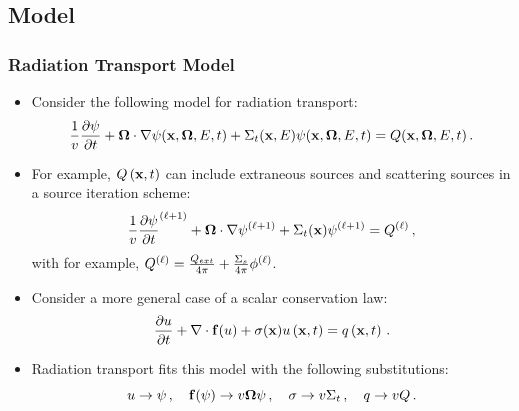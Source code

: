\documentclass{beamer} \useoutertheme{infolines}
\begin{document}
\subsection{Model}
\begin{frame}
\frametitle{Radiation Transport Model}

\begin{itemize}
  \item Consider the following model for radiation transport:
    \begin{equation}\label{eq:rad_transport}
      \frac{1}{v}\frac{\partial \psi}{\partial t}
        + \mathbf{\Omega}\cdot\nabla\psi(\mathbf{x},\mathbf{\Omega},E,t)
        + \Sigma_t(\mathbf{x},E)\psi(\mathbf{x},\mathbf{\Omega},E,t)
        = Q(\mathbf{x},\mathbf{\Omega},E,t) \,.
    \end{equation}
  \item For example, $Q\left(\mathbf{x},t\right)$ can include extraneous sources
    and scattering sources in a source iteration scheme:
    \begin{equation}
      \frac{1}{v}\frac{\partial \psi}{\partial t}^{(\ell+1)}
        + \mathbf{\Omega}\cdot\nabla\psi^{(\ell+1)}
        + \Sigma_t(\mathbf{x})\psi^{(\ell+1)}
        = Q^{(\ell)} \,,
    \end{equation}
    with for example, $Q^{(\ell)}=
    \frac{Q_{ext}}{4\pi} + \frac{\Sigma_s}{4\pi}\phi^{(\ell)}$.
  \item Consider a more general case of a scalar conservation law:
    \begin{equation}
      \frac{\partial u}{\partial t} + \nabla\cdot\mathbf{f}(u)
      + \sigma(\mathbf{x})u\left(\mathbf{x},t\right)
      = q\left(\mathbf{x},t\right) \,.
    \end{equation}
  \item Radiation transport fits this model with the following substitutions:
\[
  u\rightarrow\psi
  \,, \quad
  \mathbf{f}(\psi)\rightarrow v\mathbf{\Omega}\psi
  \,, \quad
  \sigma\rightarrow v\Sigma_t
  \,, \quad
  q\rightarrow vQ
  \,.
\]
\end{itemize}

\end{frame}
\end{document}
